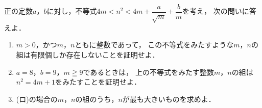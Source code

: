 \documentclass[../../main.tex]{subfiles}
\begin{document}
正の定数$a$，$b$に対し，不等式$\displaystyle 4m<n^2<4m+\dfrac{a}{\sqrt{m}}+\dfrac{b}{m}$を考え，
次の問いに答えよ．
\begin{enumerate}
  \item[(イ)] $m>0$，かつ$m$，$n$ともに整数であって，
    この不等式をみたすような$m$，$n$の組は有限個しか存在しないことを証明せよ．
  \item[(ロ)] $a=8$，$b=9$，$m\geqq9$であるときは，
    上の不等式をみたす整数$m$，$n$の組は$n^2=4m+1$をみたすことを証明せよ．
  \item[(ハ)] (ロ)の場合の$m$，$n$の組のうち，$n$が最も大きいものを求めよ．
\end{enumerate}
\end{document}
